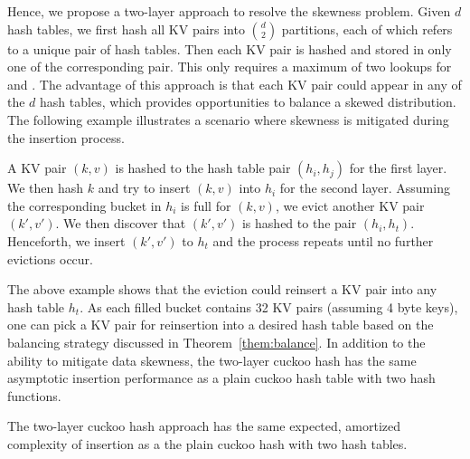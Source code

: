 Hence, we propose a two-layer approach to resolve the skewness problem.
Given $d$ hash tables, we first hash all KV pairs into $\binom{d}{2}$ partitions, 
each of which refers to a unique pair of hash tables. Then each KV pair is hashed and stored in only one of the corresponding pair. This only requires a maximum of two lookups for  and . The advantage of this approach is that each KV pair could appear in any of the $d$ hash tables, which provides opportunities to balance a skewed distribution. The following example illustrates a scenario where skewness is mitigated during the insertion process. 

\begin{example}
A KV pair $(k,v)$ is hashed to the hash table pair $(h_i,h_j)$ for the first layer. We then hash $k$ and try to insert $(k,v)$ into $h_i$ for the second layer. Assuming the corresponding bucket in $h_i$ is full for $(k,v)$, we evict another KV pair $(k',v')$. We then discover that $(k',v')$ is hashed to the pair $(h_i,h_t)$. Henceforth, we insert $(k',v')$ to $h_t$ and the process repeats until no further evictions occur.
\end{example}

The above example shows that the eviction could reinsert a KV pair into any hash table $h_t$. As each filled bucket contains 32 KV pairs (assuming 4 byte keys), one can pick a KV pair for reinsertion into a desired hash table based on the balancing strategy discussed in Theorem~\ref{them:balance}. In addition to the ability to mitigate data skewness, the two-layer cuckoo hash has the same asymptotic insertion performance as a plain cuckoo hash table with two hash functions.  

\begin{theorem}\label{them:complexity}
The two-layer cuckoo hash approach has the same expected, amortized complexity of insertion as a the plain cuckoo hash with two hash tables. 
\end{theorem}

